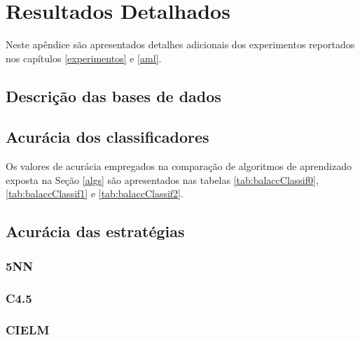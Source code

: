 \chapter{Resultados Detalhados}\label{detalhes}
Neste apêndice são apresentados detalhes adicionais dos experimentos reportados
nos capítulos \ref{experimentos} e \ref{aml}.

\section{Descrição das bases de dados}


\section{Acurácia dos classificadores}
Os valores de acurácia empregados na comparação de algoritmos de aprendizado
exposta na Seção \ref{algs} são apresentados nas tabelas \ref{tab:balaccClassif0},
\ref{tab:balaccClassif1} e \ref{tab:balaccClassif2}.


\section{Acurácia das estratégias}

\subsection{5NN}
\afterpage{\clearpage\begin{landscape}

\end{landscape}\clearpage}

\subsection{C4.5}
\afterpage{\clearpage\begin{landscape}

\end{landscape}\clearpage}

\subsection{CIELM}
\afterpage{\clearpage\begin{landscape}

\end{landscape}\clearpage}

